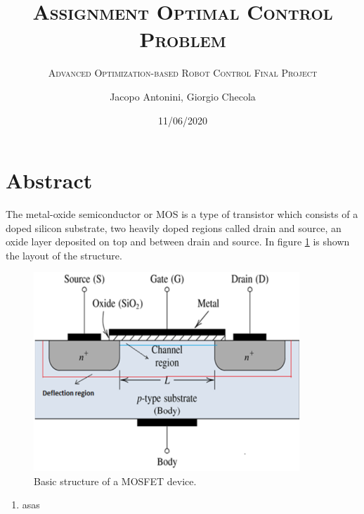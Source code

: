 \documentclass[11pt,a4paper]{article}
\title{\textsc{Assignment Optimal Control Problem}}
\subtitle{\textsc{Advanced Optimization-based Robot Control Final Project}}
\date{11/06/2020}
\author{Jacopo Antonini, Giorgio Checola}
\begin{document}
	
	\graphicspath{ {./images/} }
	\maketitle
	\thispagestyle{empty}
	\newpage
	\thispagestyle{empty}
	\mbox{}
	\newpage
	
	
	
	\section*{Abstract}
		The metal-oxide semiconductor or MOS is a type of transistor which consists of a doped silicon substrate, two heavily doped regions called drain and source, an oxide layer deposited on top and between drain and source. In figure \ref*{fig:mosfet} is shown the layout of the structure.
			\begin{figure}[h]
				\centering
				\includegraphics[width=100mm]{mosfet}
				\caption{Basic structure of a MOSFET device.}
				\label{fig:mosfet}
			\end{figure}
		\begin{enumerate}
			\item asas
		\end{enumerate}	
\end{document}
